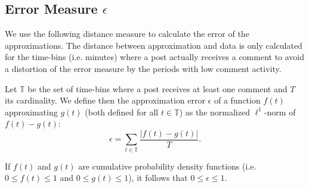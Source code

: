 \documentclass[twoside,11pt]{article}
\begin{document}
\begin{appendix}
\section{Error Measure $\epsilon$}
\noindent \label{sec:error}\hspace{-1mm} We use the following distance
measure to calculate the error of the approximations. The distance
between approximation and data is only calculated for the time-bins
(i.e.  minutes) where a post actually receives a comment to avoid a
distortion of the error measure by the periods with low comment
activity.
\begin{definition}
  Let $\mathbb{T}$ be the set of time-bins where a post receives at
  least one comment and $T$ its cardinality.  We define then the
  approximation error $\epsilon$ of a function $f(t)$ approximating
  $g(t)$ (both defined for all $t \in \mathbb{T}$) as the normalized
  $\ell^1$-norm of $f(t)-g(t)$:
\begin{equation}
\epsilon=\sum_{t \in \mathbb{T}}\frac{|f(t)-g(t)|}{T}.
\end{equation}
\end{definition}\noindent
If $f(t)$ and $g(t)$ are cumulative probability density functions
(i.e. $0 \leq f(t) \leq 1$ and $0 \leq g(t) \leq 1$), it follows that $0
\leq \epsilon \leq 1$.  
\end{appendix}

\vskip 0.2in


\end{document}

